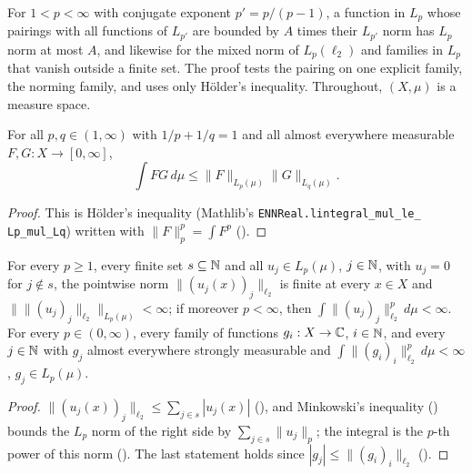 For $1 < p < \infty$ with conjugate exponent $p' = p/(p - 1)$, a function in $L_p$ whose
pairings with all functions of $L_{p'}$ are bounded by $A$ times their $L_{p'}$ norm has $L_p$
norm at most $A$, and likewise for the mixed norm of $L_p(\ell_2)$ and families in $L_p$ that
vanish outside a finite set. The proof tests the pairing on one explicit family, the norming
family, and uses only H\"older's inequality. Throughout, $(X, \mu)$ is a measure space.

\begin{lemma}
\label{lem:holder-lp-norms}
\leanok
{}
For all $p, q \in (1, \infty)$ with $1/p + 1/q = 1$ and all almost everywhere measurable
$F, G : X \to [0, \infty]$,
\[
  \int F G \, d\mu \leq \|F\|_{L_p(\mu)} \|G\|_{L_q(\mu)} .
\]
\end{lemma}

\begin{proof}
\leanok
This is H\"older's inequality (Mathlib's
\texttt{ENNReal.\allowbreak lintegral\_\allowbreak mul\_\allowbreak le\_\allowbreak
Lp\_\allowbreak mul\_\allowbreak Lq}) written with $\|F\|_p^p = \int F^p$
().
\end{proof}

\begin{lemma}
\label{lem:finite-families-lp-l2}
\leanok
{}
For every $p \geq 1$, every finite set $s \subseteq \mathbb{N}$ and all $u_j \in L_p(\mu)$, $j \in \mathbb{N}$,
with $u_j = 0$ for $j \notin s$, the pointwise norm $\|(u_j(x))_j\|_{\ell_2}$ is finite at every
$x \in X$ and $\bigl\| \|(u_j)_j\|_{\ell_2} \bigr\|_{L_p(\mu)} < \infty$; if moreover
$p < \infty$, then $\int \|(u_j)_j\|_{\ell_2}^p \, d\mu < \infty$. For every
$p \in (0, \infty)$, every family of functions $g_i : X \to \mathbb{C}$, $i \in \mathbb{N}$, and every $j \in \mathbb{N}$
with $g_j$ almost everywhere strongly measurable and
$\int \|(g_i)_i\|_{\ell_2}^p \, d\mu < \infty$, $g_j \in L_p(\mu)$.
\end{lemma}

\begin{proof}
\leanok
$\|(u_j(x))_j\|_{\ell_2} \leq \sum_{j \in s} |u_j(x)|$ (), and Minkowski's
inequality () bounds the $L_p$ norm of the right side by
$\sum_{j \in s} \|u_j\|_p$; the integral is the $p$-th power of this norm
(). The last statement holds since
$|g_j| \leq \|(g_i)_i\|_{\ell_2}$ ().
\end{proof}

